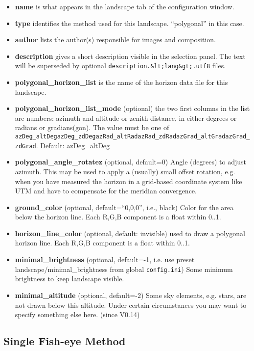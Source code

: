 \begin{itemize}
\item
  \textbf{name} is what appears in the landscape tab of the
  configuration window.
\item
  \textbf{type} identifies the method used for this landscape.
  ``polygonal'' in this case.
\item
  \textbf{author} lists the author(s) responsible for images and
  composition.
\item
  \textbf{description} gives a short description visible in the
  selection panel. The text will be superseded by optional
  \texttt{description.\&lt;lang\&gt;.utf8} files.
\item
  \textbf{polygonal\_horizon\_list} is the name of the horizon data file
  for this landscape.
\item
  \textbf{polygonal\_horizon\_list\_mode} (optional) the two first
  columns in the list are numbers: azimuth and altitude or zenith
  distance, in either degrees or radians or gradians(gon). The value
  must be one of
  \texttt{azDeg\_altDeg\textbar{}azDeg\_zdDeg\textbar{}azRad\_altRad\textbar{}azRad\_zdRad\textbar{}azGrad\_altGrad\textbar{}azGrad\_zdGrad}.
  Default: azDeg\_altDeg
\item
  \textbf{polygonal\_angle\_rotatez} (optional, default=0) Angle
  (degrees) to adjust azimuth. This may be used to apply a (usually)
  small offset rotation, e.g. when you have measured the horizon in a
  grid-based coordinate system like UTM and have to compensate for the
  meridian convergence.
\item
  \textbf{ground\_color} (optional, default=``0,0,0'', i.e., black)
  Color for the area below the horizon line. Each R,G,B component is a
  float within 0..1.
\item
  \textbf{horizon\_line\_color} (optional, default: invisible) used to
  draw a polygonal horizon line. Each R,G,B component is a float within
  0..1.
\item
  \textbf{minimal\_brightness} (optional, default=-1, i.e. use preset
  landscape/minimal\_brightness from global \texttt{config.ini}) Some
  minimum brightness to keep landscape visible.
\item
  \textbf{minimal\_altitude} (optional, default=-2) Some sky elements,
  e.g. stars, are not drawn below this altitude. Under certain
  circumstances you may want to specify something else here. (since
  V0.14)
\end{itemize}

\subsection{Single Fish-eye Method}\label{single-fish-eye-method}

